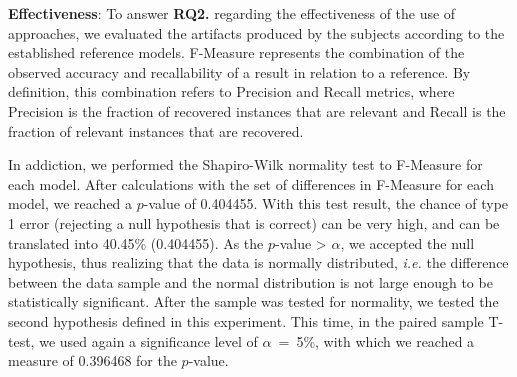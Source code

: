 \documentclass[a4paper,twoside,anonymous]{article}
\begin{document}
\textbf{Effectiveness}: To answer \textbf{RQ2.} regarding the effectiveness of the use of approaches, we evaluated the artifacts produced by the subjects according to the established reference models. 
F-Measure represents the combination of the observed accuracy and recallability of a result in relation to a reference.
By definition, this combination refers to Precision and Recall metrics, where Precision is the fraction of recovered instances that are relevant and Recall is the fraction of relevant instances that are recovered.

In addiction, we performed the Shapiro-Wilk normality test to F-Measure for each model. 
After calculations with the set of differences in F-Measure for each model, we reached a $p$-value of 0.404455.
With this test result, the chance of type 1 error (rejecting a null hypothesis that is correct) can be very high, and can be translated into 40.45\% (0.404455).
As the $p$-value > $\alpha$, we accepted the null hypothesis, thus realizing that the data is normally distributed, \textit{i.e.} the difference between the data sample and the normal distribution is not large enough to be statistically significant.
After the sample was tested for normality, we tested the second hypothesis defined in this experiment.
This time, in the paired sample T-test, we used again a significance level of $\alpha$~=~5\%, with which we reached a measure of 0.396468 for the $p$-value.
\end{document}
